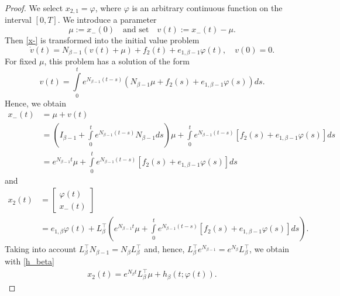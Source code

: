 \documentclass[preprint,12pt]{elsarticle}
\numberwithin{equation}{section}
\theoremstyle{definition}
\begin{document}
\begin{proof}
We select $x_{2,1}=\varphi$, where $\varphi$ is an arbitrary continuous function on the interval $[0,T]$. We introduce a parameter
\begin{equation*}
    \mu:=x_-(0) \quad \mbox{and set} \quad
    v(t):=x_-(t)-\mu.
\end{equation*}
Then \eqref{x-} is transformed into the initial value problem
\begin{equation*}
    \dot{v}(t)=N_{\beta-1}(v(t)+\mu)+ f_2(t)+ e_{1,\beta-1}\varphi(t),\quad v(0)=0.
\end{equation*}
For fixed $\mu$, this problem has a solution of the form
\begin{equation*}\label{under_sol}
    v(t)=\int\limits_0^t e^{N_{\beta-1}(t-s)}\left(N_{\beta-1}\mu+f_2(s) + e_{1,\beta-1}\varphi(s)\right)ds.
\end{equation*}
Hence, we obtain
\begin{equation*}\begin{aligned}
        x_-(t)&=\mu+v(t)\\
        &=\left(I_{\beta-1}+\int\limits_0^t e^{N_{\beta-1}(t-s)}N_{\beta-1}ds\right)\mu+\int\limits_0^t e^{N_{\beta-1}(t-s)}[f_2(s) + e_{1,\beta-1}\varphi(s)]ds\\
        &=e^{N_{\beta-1}t}\mu+\int\limits_0^t e^{N_{\beta-1}(t-s)}[f_2(s) + e_{1,\beta-1}\varphi(s)]ds
\end{aligned}
\end{equation*}
and
\begin{equation*}
\begin{aligned}
    x_2(t)&=\begin{bmatrix}
        \varphi(t)\\x_-(t)
\end{bmatrix}\\
&=e_{1,\beta}\varphi(t)+L_{\beta}^\top\left(e^{N_{\beta-1}t}\mu+\int\limits_0^t e^{N_{\beta-1}(t-s)}\left[f_2(s) + e_{1,\beta-1}\varphi(s)\right]ds\right).
\end{aligned}
\end{equation*}
Taking into account 
$L_{\beta}^\top N_{\beta-1}=N_{\beta}L_{\beta}^\top$
and, hence, 
$L_{\beta}^\top e^{N_{\beta-1}}=e^{N_{\beta}}L_{\beta}^\top$,  we obtain with  \eqref{h_beta}
\begin{equation}\label{x2_gen}\begin{aligned}
    x_2(t)=e^{N_{\beta}t}L_{\beta}^\top \mu+h_{\beta}(t;\varphi(t)).
\end{aligned}\end{equation}


\end{proof}
\end{document}
